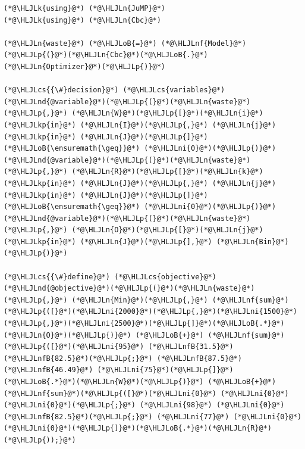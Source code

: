 \documentclass[12pt,a4paper]{article}
\newcommand{\HLJLk}[1]{\textcolor[RGB]{148,91,176}{\textbf{#1}}}
\newcommand{\HLJLkp}[1]{\textcolor[RGB]{148,91,176}{\textbf{#1}}}
\newcommand{\HLJLn}[1]{#1}
\newcommand{\HLJLnd}[1]{\textcolor[RGB]{214,102,97}{#1}}
\newcommand{\HLJLnf}[1]{\textcolor[RGB]{66,102,213}{#1}}
\newcommand{\HLJLnfB}[1]{\textcolor[RGB]{59,151,46}{#1}}
\newcommand{\HLJLni}[1]{\textcolor[RGB]{59,151,46}{#1}}
\newcommand{\HLJLoB}[1]{\textcolor[RGB]{102,102,102}{\textbf{#1}}}
\newcommand{\HLJLp}[1]{#1}
\newcommand{\HLJLcs}[1]{\textcolor[RGB]{153,153,119}{\textit{#1}}}
\begin{document}
\begin{lstlisting}
(*@\HLJLk{using}@*) (*@\HLJLn{JuMP}@*)
(*@\HLJLk{using}@*) (*@\HLJLn{Cbc}@*)

(*@\HLJLn{waste}@*) (*@\HLJLoB{=}@*) (*@\HLJLnf{Model}@*)(*@\HLJLp{(}@*)(*@\HLJLn{Cbc}@*)(*@\HLJLoB{.}@*)(*@\HLJLn{Optimizer}@*)(*@\HLJLp{)}@*)

(*@\HLJLcs{{\#}decision}@*) (*@\HLJLcs{variables}@*)
(*@\HLJLnd{@variable}@*)(*@\HLJLp{(}@*)(*@\HLJLn{waste}@*)(*@\HLJLp{,}@*) (*@\HLJLn{W}@*)(*@\HLJLp{[}@*)(*@\HLJLn{i}@*) (*@\HLJLkp{in}@*) (*@\HLJLn{I}@*)(*@\HLJLp{,}@*) (*@\HLJLn{j}@*) (*@\HLJLkp{in}@*) (*@\HLJLn{J}@*)(*@\HLJLp{]}@*) (*@\HLJLoB{\ensuremath{\geq}}@*) (*@\HLJLni{0}@*)(*@\HLJLp{)}@*)
(*@\HLJLnd{@variable}@*)(*@\HLJLp{(}@*)(*@\HLJLn{waste}@*)(*@\HLJLp{,}@*) (*@\HLJLn{R}@*)(*@\HLJLp{[}@*)(*@\HLJLn{k}@*) (*@\HLJLkp{in}@*) (*@\HLJLn{J}@*)(*@\HLJLp{,}@*) (*@\HLJLn{j}@*) (*@\HLJLkp{in}@*) (*@\HLJLn{J}@*)(*@\HLJLp{]}@*) (*@\HLJLoB{\ensuremath{\geq}}@*) (*@\HLJLni{0}@*)(*@\HLJLp{)}@*)
(*@\HLJLnd{@variable}@*)(*@\HLJLp{(}@*)(*@\HLJLn{waste}@*)(*@\HLJLp{,}@*) (*@\HLJLn{O}@*)(*@\HLJLp{[}@*)(*@\HLJLn{j}@*) (*@\HLJLkp{in}@*) (*@\HLJLn{J}@*)(*@\HLJLp{],}@*) (*@\HLJLn{Bin}@*)(*@\HLJLp{)}@*)

(*@\HLJLcs{{\#}define}@*) (*@\HLJLcs{objective}@*)
(*@\HLJLnd{@objective}@*)(*@\HLJLp{(}@*)(*@\HLJLn{waste}@*)(*@\HLJLp{,}@*) (*@\HLJLn{Min}@*)(*@\HLJLp{,}@*) (*@\HLJLnf{sum}@*)(*@\HLJLp{([}@*)(*@\HLJLni{2000}@*)(*@\HLJLp{,}@*)(*@\HLJLni{1500}@*)(*@\HLJLp{,}@*)(*@\HLJLni{2500}@*)(*@\HLJLp{]}@*)(*@\HLJLoB{.*}@*)(*@\HLJLn{O}@*)(*@\HLJLp{)}@*) (*@\HLJLoB{+}@*) (*@\HLJLnf{sum}@*)(*@\HLJLp{([}@*)(*@\HLJLni{95}@*) (*@\HLJLnfB{31.5}@*) (*@\HLJLnfB{82.5}@*)(*@\HLJLp{;}@*) (*@\HLJLnfB{87.5}@*) (*@\HLJLnfB{46.49}@*) (*@\HLJLni{75}@*)(*@\HLJLp{]}@*)(*@\HLJLoB{.*}@*)(*@\HLJLn{W}@*)(*@\HLJLp{)}@*) (*@\HLJLoB{+}@*) (*@\HLJLnf{sum}@*)(*@\HLJLp{([}@*)(*@\HLJLni{0}@*) (*@\HLJLni{0}@*) (*@\HLJLni{0}@*)(*@\HLJLp{;}@*) (*@\HLJLni{98}@*) (*@\HLJLni{0}@*) (*@\HLJLnfB{82.5}@*)(*@\HLJLp{;}@*) (*@\HLJLni{77}@*) (*@\HLJLni{0}@*) (*@\HLJLni{0}@*)(*@\HLJLp{]}@*)(*@\HLJLoB{.*}@*)(*@\HLJLn{R}@*)(*@\HLJLp{));}@*)


\end{lstlisting}
\end{document}
